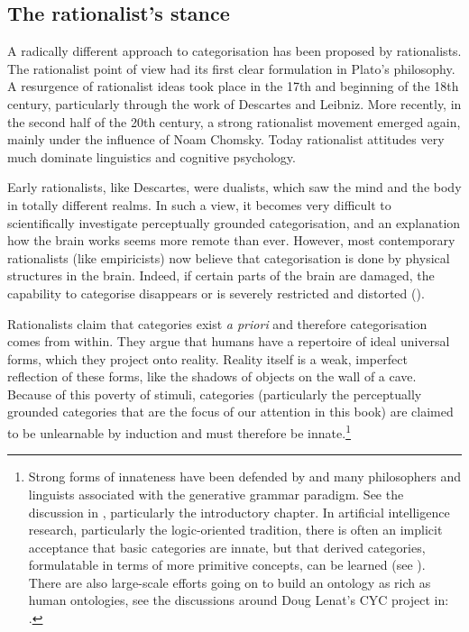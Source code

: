 \subsection{The rationalist's stance}

A radically different approach to categorisation has been 
proposed by rationalists. 
The rationalist point of view had its first clear formulation 
in Plato's philosophy. A resurgence of rationalist ideas
took place in the 17th and beginning of the
18th century, particularly through the work of 
Descartes and Leibniz. More recently, in the second half of
the 20th century, a strong rationalist movement
emerged again, mainly under the influence of Noam
Chomsky. Today rationalist attitudes very much 
dominate linguistics and cognitive psychology. 

Early rationalists, like Descartes, were dualists, which
saw the mind and the body in totally different realms. 
In such a view, it becomes very difficult to scientifically investigate 
perceptually grounded categorisation, and an explanation 
how the brain works seems more remote than ever. However, 
most contemporary rationalists (like empiricists)
now believe that categorisation
is done by physical structures in the brain. Indeed, 
if certain parts of the brain are damaged, the capability 
to categorise disappears or is severely restricted and 
distorted (\cite{Deacon:1998}). 

Rationalists claim that categories 
exist {\itshape a priori} and therefore categorisation comes from
within. They argue that humans have a repertoire of ideal universal
forms, which they project
onto reality. Reality itself is a weak, imperfect 
reflection of these forms, like the shadows of objects
on the wall of a cave. Because of this poverty of stimuli, 
categories (particularly the perceptually grounded
categories that are the focus of our attention in this 
book) are claimed to be unlearnable by induction and must
therefore be innate.\footnote{
Strong forms of innateness have been defended by 
\cite{Fodor:1983}
and many philosophers and linguists associated with the 
generative grammar paradigm. See the discussion in
\cite{Wierzbicka:1992}, particularly the introductory chapter. 
In artificial intelligence 
research, particularly the logic-oriented tradition, there
is often an implicit acceptance that basic categories 
are innate, but that derived categories, formulatable
in terms of more primitive concepts, can be learned
(see \cite{McCarthy:2008}). There are also 
large-scale efforts going on to build an ontology as 
rich as human ontologies, see the discussions around
Doug Lenat's CYC project in: \cite{Steels:1994}.}

